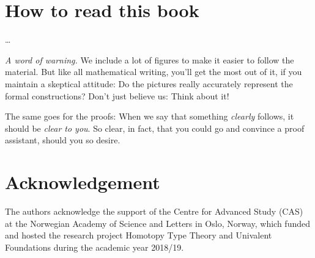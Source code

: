 \bigskip

\section*{How to read this book}

\ldots

\noindent\emph{A word of warning.}\enspace
We include a lot of figures to make it easier to follow the material.
But like all mathematical writing, you'll get the most out of it,
if you maintain a skeptical attitude:
Do the pictures really accurately represent the formal constructions?
Don't just believe us: Think about it!

The same goes for the proofs: When we say that something \emph{clearly} follows,
it should be \emph{clear to you}.
So clear, in fact, that you could go and convince a proof assistant,
should you so desire.

\section*{Acknowledgement}
The authors acknowledge the support of the Centre for Advanced Study (CAS)
at the Norwegian Academy of Science and Letters
in Oslo, Norway, which funded and hosted the research project Homotopy
Type Theory and Univalent Foundations during the academic year 2018/19.



